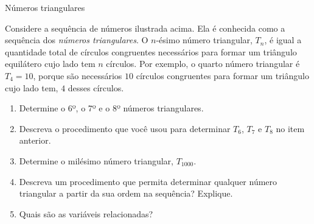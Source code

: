 \begin{task}{ Números triangulares}
\begin{figure}[H]
\end{figure}


Considere a sequência de números ilustrada acima. Ela é conhecida como a sequência dos \emph{números triangulares}. O \(n\)-ésimo número triangular, \(T_n\), é igual a quantidade total de círculos congruentes necessários para formar um triângulo equilátero cujo lado tem \(n\) círculos. Por exemplo, o quarto número triangular é \(T_4=10\), porque são necessários \(10\) círculos congruentes para formar um triângulo cujo lado tem, \(4\) desses círculos.
\begin{enumerate}
\item {} 
Determine o 6º, o 7º e o 8º números triangulares.

\item {} 
Descreva o procedimento que você usou para determinar \(T_6\), \(T_7\) e \(T_8\) no item anterior.

\item {} 
Determine o milésimo número triangular, \(T_{1000}\).

\item {} 
Descreva um procedimento que permita determinar qualquer número triangular a partir da sua ordem na sequência? Explique.

\item {} 
Quais são as variáveis relacionadas?

\end{enumerate}
\end{task}


